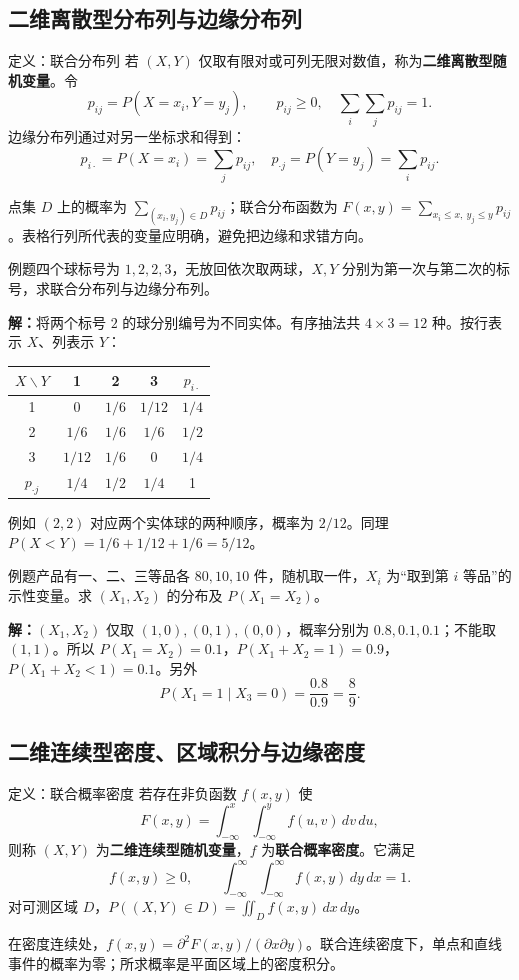 \documentclass[UTF8,fontset=none,zihao=-4,a4paper]{ctexart}
\newcommand{\term}[1]{\textbf{#1}}
\newcommand{\example}[1]{\begin{infobox}{例题}#1\end{infobox}}
\newcommand{\solution}{\par\noindent\textbf{解：}}
\begin{document}
\subsection{二维离散型分布列与边缘分布列}
\begin{infobox}{定义：联合分布列}
若 $(X,Y)$ 仅取有限对或可列无限对数值，称为\term{二维离散型随机变量}。令
\[
p_{ij}=P(X=x_i,Y=y_j),\qquad p_{ij}\ge0,\quad\sum_i\sum_jp_{ij}=1.
\]
边缘分布列通过对另一坐标求和得到：
\[
p_{i\cdot}=P(X=x_i)=\sum_jp_{ij},\quad
p_{\cdot j}=P(Y=y_j)=\sum_ip_{ij}.
\]
\end{infobox}
点集 $D$ 上的概率为 $\sum_{(x_i,y_j)\in D}p_{ij}$；联合分布函数为 $F(x,y)=\sum_{x_i\le x,\ y_j\le y}p_{ij}$。表格行列所代表的变量应明确，避免把边缘和求错方向。
\example{四个球标号为 $1,2,2,3$，无放回依次取两球，$X,Y$ 分别为第一次与第二次的标号，求联合分布列与边缘分布列。}
\solution 将两个标号 $2$ 的球分别编号为不同实体。有序抽法共 $4\times3=12$ 种。按行表示 $X$、列表示 $Y$：
\begin{center}\begin{tabular}{c|ccc|c}\toprule
$X\backslash Y$&1&2&3&$p_{i\cdot}$\\\midrule
1&0&$1/6$&$1/12$&$1/4$\\
2&$1/6$&$1/6$&$1/6$&$1/2$\\
3&$1/12$&$1/6$&0&$1/4$\\\midrule
$p_{\cdot j}$&$1/4$&$1/2$&$1/4$&1\\\bottomrule
\end{tabular}\end{center}
例如 $(2,2)$ 对应两个实体球的两种顺序，概率为 $2/12$。同理 $P(X<Y)=1/6+1/12+1/6=5/12$。
\example{产品有一、二、三等品各 $80,10,10$ 件，随机取一件，$X_i$ 为“取到第 $i$ 等品”的示性变量。求 $(X_1,X_2)$ 的分布及 $P(X_1=X_2)$。}
\solution $(X_1,X_2)$ 仅取 $(1,0),(0,1),(0,0)$，概率分别为 $0.8,0.1,0.1$；不能取 $(1,1)$。所以 $P(X_1=X_2)=0.1$，$P(X_1+X_2=1)=0.9$，$P(X_1+X_2<1)=0.1$。另外
\[
P(X_1=1\mid X_3=0)=\frac{0.8}{0.9}=\frac89.
\]
\subsection{二维连续型密度、区域积分与边缘密度}
\begin{infobox}{定义：联合概率密度}
若存在非负函数 $f(x,y)$ 使
\[
F(x,y)=\int_{-\infty}^x\int_{-\infty}^y f(u,v)\,dv\,du,
\]
则称 $(X,Y)$ 为\term{二维连续型随机变量}，$f$ 为\term{联合概率密度}。它满足
\[
f(x,y)\ge0,\qquad\int_{-\infty}^{\infty}\int_{-\infty}^{\infty}f(x,y)\,dy\,dx=1.
\]
对可测区域 $D$，$P((X,Y)\in D)=\iint_D f(x,y)\,dx\,dy$。
\end{infobox}
在密度连续处，$f(x,y)=\partial^2 F(x,y)/(\partial x\partial y)$。联合连续密度下，单点和直线事件的概率为零；所求概率是平面区域上的密度积分。
\end{document}
